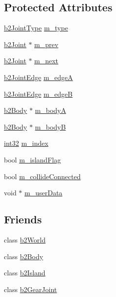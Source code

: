 \subsection*{Protected Attributes}
\begin{DoxyCompactItemize}
\item 
\mbox{\hyperlink{b2_joint_8h_a0bb202d8a286c888a11985b07b2272ab}{b2\+Joint\+Type}} \mbox{\hyperlink{classb2_joint_a3fd3f2532d108d81df81427815210a59}{m\+\_\+type}}
\item 
\mbox{\hyperlink{classb2_joint}{b2\+Joint}} $\ast$ \mbox{\hyperlink{classb2_joint_a940166e7b5d87cec1ad0603e0388854a}{m\+\_\+prev}}
\item 
\mbox{\hyperlink{classb2_joint}{b2\+Joint}} $\ast$ \mbox{\hyperlink{classb2_joint_aad16778ba9c51cebb767ff7df6ed80b5}{m\+\_\+next}}
\item 
\mbox{\hyperlink{structb2_joint_edge}{b2\+Joint\+Edge}} \mbox{\hyperlink{classb2_joint_a406ea423db1fe6484408d73df647f7b2}{m\+\_\+edgeA}}
\item 
\mbox{\hyperlink{structb2_joint_edge}{b2\+Joint\+Edge}} \mbox{\hyperlink{classb2_joint_a1041219dcd353ea815ebd78f904af547}{m\+\_\+edgeB}}
\item 
\mbox{\hyperlink{classb2_body}{b2\+Body}} $\ast$ \mbox{\hyperlink{classb2_joint_abaebb784a51abb7d66de302ba07a4467}{m\+\_\+bodyA}}
\item 
\mbox{\hyperlink{classb2_body}{b2\+Body}} $\ast$ \mbox{\hyperlink{classb2_joint_a1fd77fcbcb8a8a3729c7dc5b790d7200}{m\+\_\+bodyB}}
\item 
\mbox{\hyperlink{b2_settings_8h_a43d43196463bde49cb067f5c20ab8481}{int32}} \mbox{\hyperlink{classb2_joint_ae207295484bc040b6b52d96d63f1369f}{m\+\_\+index}}
\item 
bool \mbox{\hyperlink{classb2_joint_a777e45428d9a74d626f4afa1b45e1975}{m\+\_\+island\+Flag}}
\item 
bool \mbox{\hyperlink{classb2_joint_ac1a93c14c8dd666bb487db6c98daad33}{m\+\_\+collide\+Connected}}
\item 
void $\ast$ \mbox{\hyperlink{classb2_joint_ae8a31b6d5d6e76ccf7c975b2b3ae7366}{m\+\_\+user\+Data}}
\end{DoxyCompactItemize}
\subsection*{Friends}
\begin{DoxyCompactItemize}
\item 
class \mbox{\hyperlink{classb2_joint_a4bd536c5a7c0587913765bbc2693ceea}{b2\+World}}
\item 
class \mbox{\hyperlink{classb2_joint_a010ab52de250e5fe30a45d642f46405b}{b2\+Body}}
\item 
class \mbox{\hyperlink{classb2_joint_afc682950b8c4f251804fc1938663098b}{b2\+Island}}
\item 
class \mbox{\hyperlink{classb2_joint_a13c275221e30bb485e17e4e04553cb71}{b2\+Gear\+Joint}}
\end{DoxyCompactItemize}


